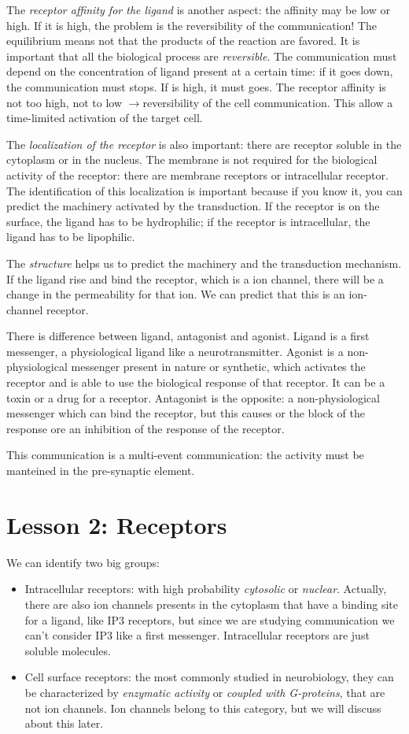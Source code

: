 \documentclass[a4paper, 12pt]{book}
\newcommand{\lfreccia}{\ensuremath{\longrightarrow}}
\begin{document}
The \emph{receptor affinity for the ligand} is another aspect: the affinity may be low or high. If it is high, the problem is the reversibility of the communication! The equilibrium means not that the products of the reaction are favored. It is important that all the biological process are \emph{reversible}. The communication must depend on the concentration of ligand present at a certain time: if it goes down, the communication must stops. If is high, it must goes. The receptor affinity is not too high, not to low \lfreccia reversibility of the cell communication. This allow a time-limited activation of the target cell.

The \emph{localization of the receptor} is also important: there are receptor soluble in the cytoplasm or in the nucleus. The membrane is not required for the biological activity of the receptor: there are membrane receptors or intracellular receptor. The identification of this localization is important because if you know it, you can predict the machinery activated by the transduction.  If the receptor is on the surface, the ligand has to be hydrophilic; if the receptor is intracellular, the ligand has to be lipophilic.

The \emph{structure} helps us to predict the machinery and the transduction mechanism. If the ligand rise and bind the receptor, which is a ion channel, there will be a change in the permeability for that ion. We can predict that this is an ion-channel receptor.

There is difference between ligand, antagonist and agonist. Ligand is a first messenger,  a physiological ligand like a neurotransmitter. Agonist is a non-physiological messenger present in nature or synthetic, which activates the receptor and is able to use the biological response of that receptor. It can be a toxin or a drug for a receptor. Antagonist is the opposite: a non-physiological messenger which can bind the receptor, but this causes or the block of the response ore an inhibition of the response of the receptor. 


This communication is a multi-event communication: the activity must be manteined in the pre-synaptic element.

\chapter{Lesson 2: Receptors}
We can identify two big groups:
\begin{itemize}
\item{Intracellular receptors: with high probability \emph{cytosolic} or \emph{nuclear}. Actually, there are also ion channels presents in the cytoplasm that have a binding site for a ligand, like IP3 receptors, but since we are studying communication we can't consider IP3 like a first messenger. Intracellular receptors are just soluble molecules.}
\item{Cell surface receptors: the most commonly studied in neurobiology, they can be characterized by \emph{enzymatic activity} or \emph{coupled with G-proteins}, that are not ion channels. Ion channels belong to this category, but we will discuss about this later.}
\end{itemize}
\end{document}
